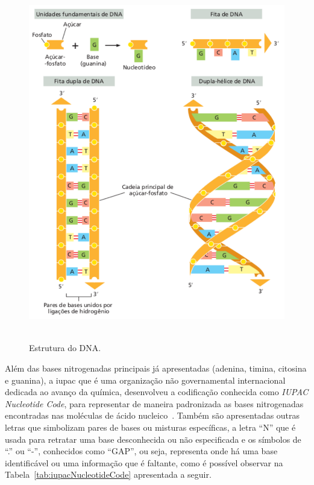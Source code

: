 \begin{figure}[htb]
  \centering
  \caption{Estrutura do DNA.}
  \includegraphics[scale=0.6]{figuras/estruturaDNA_02.pdf}
  ~\label{fig:estruturaDNA}
\end{figure}

Além das bases nitrogenadas principais já apresentadas (\gls{adenina}, \gls{timina}, \gls{citosina} e \gls{guanina}), a \gls{iupac} que é uma organização não governamental internacional dedicada ao avanço da química, desenvolveu a codificação conhecida como \textit{IUPAC Nucleotide Code}, para representar de maneira padronizada as bases nitrogenadas encontradas nas moléculas de ácido nucleico~\cite{iupac_cornish_1985, iupac_hoppe_1986}. Também são apresentadas outras letras que simbolizam pares de bases ou misturas específicas, a letra ``N'' que é usada para retratar uma base desconhecida ou não especificada e os símbolos de ``.'' ou ``-'', conhecidos como ``GAP'', ou seja, representa onde há uma base identificável ou uma informação que é faltante\cite{iupac_cornish_1985}, como é possível observar na Tabela~\ref{tab:iupacNucleotideCode} apresentada a seguir.

